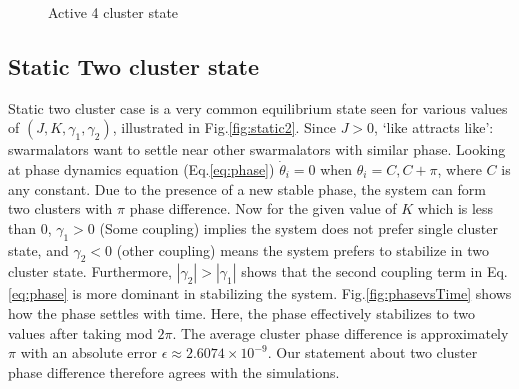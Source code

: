 \documentclass[twocolumn,10pt]{asme2ej}
\begin{document}
{\begin{figure}
        \caption{Active 4 cluster state}
    \end{figure}
    \subsection{Static Two cluster state}
    {
        \noindent
        Static two cluster case is a very common equilibrium state seen for various values of \((J,K,\gamma_1,\gamma_2)\), illustrated in  Fig.\ref{fig:static2}. Since \(J > 0\), `like attracts like': swarmalators want to settle near other swarmalators with similar phase. Looking at phase dynamics equation (Eq.\ref{eq:phase}) \(\dot{\theta}_{i} = 0\) when \(\theta_i = C, C + \pi \), where \(C\) is any constant. Due to the presence of a new stable phase, the system can form two clusters with \(\pi\) phase difference. Now for the given value of \(K\) which is less than 0, \(\gamma_1 > 0\) (Some coupling) implies the system does not prefer single cluster state, and \(\gamma_2 < 0\) (other coupling) means the system prefers to stabilize in two cluster state. Furthermore, \(|\gamma_2| > |\gamma_1|\) shows that the second coupling term in Eq.\ref*{eq:phase} is more dominant in stabilizing the system. Fig.\ref{fig:phasevsTime} shows how the phase settles with time. Here, the phase effectively stabilizes to two values after taking mod \(2\pi\). The average cluster phase difference is approximately \(\pi\) with an absolute error \(\epsilon \approx 2.6074 \times 10^{-9}\). Our statement about two cluster phase difference therefore agrees with the simulations. 

}}
\end{document}

